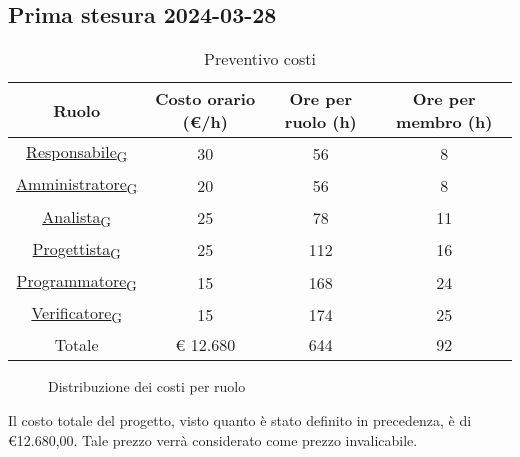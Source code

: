 \subsection{Prima stesura 2024-03-28}
\begin{table}[!h]
	\centering
		\begin{tabular}{ | c | c | c | c | }
			\hline
			\textbf{Ruolo}   & \textbf{Costo orario (€/h)} & \textbf{Ore per ruolo (h)} & \textbf{Ore per membro (h)} \\
			\hline
			\href{https://7last.github.io/docs/rtb/documentazione-interna/glossario\#responsabile}{Responsabile\textsubscript{G}}   & 30           & 56            & 8              \\
			\href{https://7last.github.io/docs/rtb/documentazione-interna/glossario\#amministratore}{Amministratore\textsubscript{G}} & 20           & 56            & 8              \\
			\href{https://7last.github.io/docs/rtb/documentazione-interna/glossario\#analista}{Analista\textsubscript{G}}       & 25           & 78            & 11             \\
			\href{https://7last.github.io/docs/rtb/documentazione-interna/glossario\#progettista}{Progettista\textsubscript{G}}    & 25           & 112           & 16             \\
			\href{https://7last.github.io/docs/rtb/documentazione-interna/glossario\#programmatore}{Programmatore\textsubscript{G}}  & 15           & 168           & 24             \\
			\href{https://7last.github.io/docs/rtb/documentazione-interna/glossario\#verificatore}{Verificatore\textsubscript{G}}   & 15           & 174           & 25             \\
			\hline
			Totale         & € 12.680     & 644           & 92             \\
			\hline
		\end{tabular}
        \caption{Preventivo costi}
\end{table}
\begin{figure}[!h]
    \centering
    \caption{Distribuzione dei costi per ruolo}
\end{figure}
\begin{flushleft}
Il costo totale del progetto, visto quanto è stato definito in precedenza, è di €12.680,00. Tale prezzo verrà considerato come prezzo invalicabile.
\end{flushleft}
